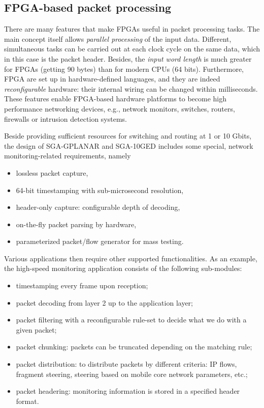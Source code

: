\documentclass[journal]{IEEEtran}
\begin{document}
\subsection{FPGA-based packet processing}

There are many features that make FPGAs useful in packet processing tasks. The main concept itself allows \emph{parallel processing} of the input data. Different, simultaneous tasks can be carried out at each clock cycle on the same data, which in this case is the packet header. Besides, the \emph{input word length} is much greater for FPGAs (getting 90 bytes) than for modern CPUs (64 bits). Furthermore, FPGA are set up in hardware-defined languages, and they are indeed \emph{reconfigurable} hardware: their internal wiring can be changed within milliseconds. These features enable FPGA-based hardware platforms to become high performance networking devices, e.g., network monitors, switches, routers, firewalls or intrusion detection systems.

Beside providing sufficient resources for switching and routing at 1 or 10 Gbit\/s, the design of SGA-GPLANAR \cite{GPLANAR} and SGA-10GED \cite{10GED} includes some special, network monitoring-related requirements, namely 
\begin{itemize}
\renewcommand\labelitemi{--}
\item lossless packet capture,
\item 64-bit timestamping with sub-microsecond resolution,
\item header-only capture: configurable depth of decoding,
\item on-the-fly packet parsing by hardware,
\item parameterized packet/flow generator for mass testing.
\end{itemize}

Various applications then require other supported functionalities. As an example, the high-speed monitoring application \cite{HPSR_2015} consists of the following sub-modules:
\begin{itemize}
\renewcommand\labelitemi{--}
\item timestamping every frame upon reception;
\item packet decoding from layer 2  up to the application layer;
\item packet filtering with a reconfigurable rule-set to decide what we do with a given packet;
\item packet chunking: packets can be truncated depending on the matching rule;
\item packet distribution: to distribute packets by different criteria: IP flows, fragment steering, steering based on mobile core network parameters, etc.;
\item packet headering: monitoring information is stored in a specified header format.
\end{itemize}
\end{document}
